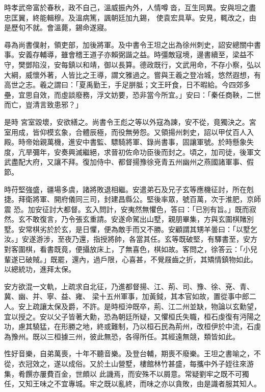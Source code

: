 \begin{pinyinscope}
 時孝武帝富於春秋，政不自己，溫威振內外，人情噂沓，互生同異。安與坦之盡忠匡翼，終能輯穆。及溫病篤，諷朝廷加九錫，
 使袁宏具草。安見，輒改之，由是歷旬不就。會溫薨，錫命遂寢。



 尋為尚書僕射，領吏部，加後將軍。及中書令王坦之出為徐州刺史，詔安總關中書事。安義存輔導，雖會稽王道子亦賴弼諧之益。時彊敵寇境，邊書續至，梁益不守，樊鄧陷沒，安每鎮以和靖，御以長算。德政既行，文武用命，不存小察，弘以大綱，威懷外著，人皆比之王導，謂文雅過之。嘗與王羲之登冶城，悠然遐想，有高世之志。羲之謂曰：「夏禹勤王，手足胼胝；文王旰食，日不暇給。今四郊多壘，宜思自效，而虛談廢務，浮文妨要，恐非當今所宜。」安曰：「秦任商鞅，二世而亡，豈清言致患邪？」



 是時
 宮室毀壞，安欲繕之。尚書令王彪之等以外寇為諫，安不從，竟獨決之。宮室用成，皆仰模玄象，合體辰極，而役無勞怨。又領揚州刺史，詔以甲仗百人入殿。時帝始親萬機，進安中書監、驃騎將軍、錄尚書事，固讓軍號。於時懸象失度，亢旱彌年，安奏興滅繼絕，求晉初佐命功臣後而封之。頃之，加司徒，後軍文武盡配大府，又讓不拜。復加侍中、都督揚豫徐兗青五州幽州之燕國諸軍事、假節。



 時苻堅強盛，疆場多虞，諸將敗退相繼。安遣弟石及兄子玄等應機征討，所在剋捷。拜衛將軍、開府儀同三司，封建昌縣公。堅後率眾，號百萬，次于淮肥，京師震
 恐。加安征討大都督。玄入問計，安夷然無懼色，答曰：「已別有旨。」既而寂然。玄不敢復言，乃令張玄重請。安遂命駕出山墅，親朋畢集，方與玄圍棋賭別墅。安常棋劣於於玄，是日懼，便為敵手而又不勝。安顧謂其甥羊曇曰：「以墅乞汝。」安遂游涉，至夜乃還，指授將帥，各當其任。玄等既破堅，有驛書至，安方對客圍棋，看書既竟，便攝放床上，了無喜色，棋如故。客問之，徐答云：「小兒輩遂已破賊。」既罷，還內，過戶限，心喜甚，不覺屐齒之折，其矯情鎮物如此。以總統功，進拜太保。



 安方欲混一文軌，上疏求自北征，乃進都督揚、江、荊、司、豫、徐、兗、青、冀、幽、并、寧、益、雍、
 梁十五州軍事，加黃鉞，其本官如故，置從事中郎二人。安上疏讓太保及爵，不許。是時桓沖既卒，荊、江二州並缺，物論以玄勳望，宜以授之。安以父子皆著大勳，恐為朝廷所疑，又懼桓氏失職，桓石虔復有沔陽之功，慮其驍猛，在形勝之地，終或難制，乃以桓石民為荊州，改桓伊於中流，石虔為豫州。既以三桓據三州，彼此無恐，各得所任。其經遠無競，類皆如此。



 性好音樂，自弟萬喪，十年不聽音樂。及登台輔，期喪不廢樂。王坦之書喻之，不從，衣冠效之，遂以成俗。又於土山營墅，樓館林竹甚盛，每攜中外子姪往來游集，肴饌亦屢費百金，世頗以
 此譏焉，而安殊不以屑意。常疑劉牢之既不可獨任，又知王味之不宜專城。牢之既以亂終，而味之亦以貪敗，由是識者服其知人。




\end{pinyinscope}
